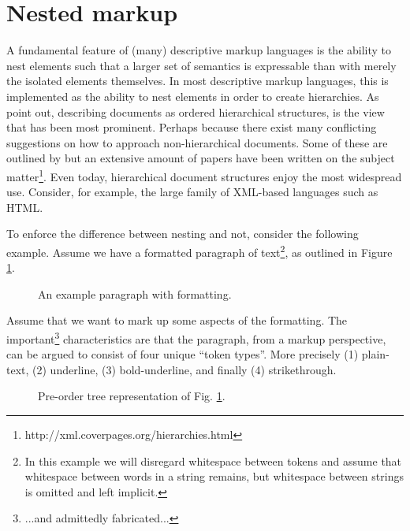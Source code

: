 \documentclass{scrreprt}
\begin{document}
\section{Nested markup}
\label{sec:nesting}
A fundamental feature of (many) descriptive markup languages is the ability to nest elements such that a larger set of semantics is expressable than with merely the isolated elements themselves. In most descriptive markup languages, this is implemented as the ability to nest elements in order to create hierarchies. As \citet*{durand} point out, describing documents as ordered hierarchical structures, is the view that has been most prominent. Perhaps because there exist many conflicting suggestions on how to approach non-hierarchical documents. Some of these are outlined by \citet{durand} but an extensive amount of papers have been written on the subject matter\footnote{http://xml.coverpages.org/hierarchies.html}. Even today, hierarchical document structures enjoy the most widespread use. Consider, for example, the large family of XML-based languages such as HTML.



To enforce the difference between nesting and not, consider the following example. Assume we have a formatted paragraph of text\footnote{In this example we will disregard whitespace between tokens and assume that whitespace between words in a string remains, but whitespace between strings is omitted and left implicit.}, as outlined in Figure \ref{fig:mixed-content-paragraph}.


\begin{figure}[h]
\centering
{}
\caption{An example paragraph with formatting.}
\label{fig:mixed-content-paragraph}
\end{figure}


Assume that we want to mark up some aspects of the formatting. The important\footnote{...and admittedly fabricated...} characteristics are that the paragraph, from a markup perspective, can be argued to consist of four unique ``token types''. More precisely (1) plain-text, (2) underline, (3) bold-underline, and finally (4) strikethrough.





\begin{figure}[h]
  \centering

  \caption{Pre-order tree representation of Fig. \ref{fig:mixed-content-paragraph}.}
  \label{fig:mixed-content-flat-tree}
\end{figure}
\end{document}
